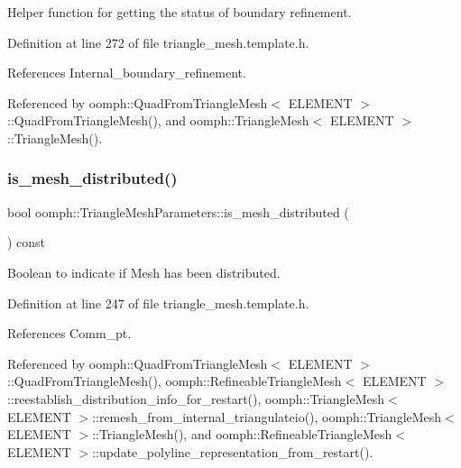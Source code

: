 Helper function for getting the status of boundary refinement. 



Definition at line 272 of file triangle\+\_\+mesh.\+template.\+h.



References Internal\+\_\+boundary\+\_\+refinement.



Referenced by oomph\+::\+Quad\+From\+Triangle\+Mesh$<$ E\+L\+E\+M\+E\+N\+T $>$\+::\+Quad\+From\+Triangle\+Mesh(), and oomph\+::\+Triangle\+Mesh$<$ E\+L\+E\+M\+E\+N\+T $>$\+::\+Triangle\+Mesh().

\mbox{\label{classoomph_1_1TriangleMeshParameters_a3ed46ad12cf1b1cb45393b8e78849fc2}} 
\subsubsection{\texorpdfstring{is\+\_\+mesh\+\_\+distributed()}{is\_mesh\_distributed()}}
{\footnotesize\ttfamily bool oomph\+::\+Triangle\+Mesh\+Parameters\+::is\+\_\+mesh\+\_\+distributed (\begin{DoxyParamCaption}{ }\end{DoxyParamCaption}) const\hspace{0.3cm}{\ttfamily [inline]}}



Boolean to indicate if Mesh has been distributed. 



Definition at line 247 of file triangle\+\_\+mesh.\+template.\+h.



References Comm\+\_\+pt.



Referenced by oomph\+::\+Quad\+From\+Triangle\+Mesh$<$ E\+L\+E\+M\+E\+N\+T $>$\+::\+Quad\+From\+Triangle\+Mesh(), oomph\+::\+Refineable\+Triangle\+Mesh$<$ E\+L\+E\+M\+E\+N\+T $>$\+::reestablish\+\_\+distribution\+\_\+info\+\_\+for\+\_\+restart(), oomph\+::\+Triangle\+Mesh$<$ E\+L\+E\+M\+E\+N\+T $>$\+::remesh\+\_\+from\+\_\+internal\+\_\+triangulateio(), oomph\+::\+Triangle\+Mesh$<$ E\+L\+E\+M\+E\+N\+T $>$\+::\+Triangle\+Mesh(), and oomph\+::\+Refineable\+Triangle\+Mesh$<$ E\+L\+E\+M\+E\+N\+T $>$\+::update\+\_\+polyline\+\_\+representation\+\_\+from\+\_\+restart().

